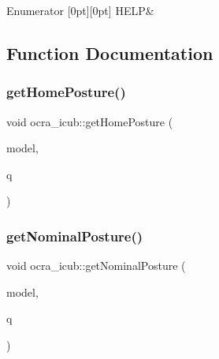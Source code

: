 \begin{DoxyEnumFields}{Enumerator}
[0pt][0pt]{}\hypertarget{namespaceocra__icub_afbd2db66b68005fb7cfac19210caf83fae7c9fa2563b6c0b14e5b05d1794dac36}{}\label{namespaceocra__icub_afbd2db66b68005fb7cfac19210caf83fae7c9fa2563b6c0b14e5b05d1794dac36} 
H\+E\+LP&\\
\hline

\end{DoxyEnumFields}


\subsection{Function Documentation}
\hypertarget{namespaceocra__icub_a91c3caf94014ea9988e56dd2572768ce}{}\label{namespaceocra__icub_a91c3caf94014ea9988e56dd2572768ce} 
\subsubsection{\texorpdfstring{get\+Home\+Posture()}{getHomePosture()}}
{\footnotesize\ttfamily void ocra\+\_\+icub\+::get\+Home\+Posture (\begin{DoxyParamCaption}\item[{const ocra\+::\+Model \&}]{model,  }\item[{Eigen\+::\+Vector\+Xd \&}]{q }\end{DoxyParamCaption})}

\hypertarget{namespaceocra__icub_a07ffe33877389b6b111944e8a666e221}{}\label{namespaceocra__icub_a07ffe33877389b6b111944e8a666e221} 
\subsubsection{\texorpdfstring{get\+Nominal\+Posture()}{getNominalPosture()}}
{\footnotesize\ttfamily void ocra\+\_\+icub\+::get\+Nominal\+Posture (\begin{DoxyParamCaption}\item[{const ocra\+::\+Model \&}]{model,  }\item[{Eigen\+::\+Vector\+Xd \&}]{q }\end{DoxyParamCaption})}



